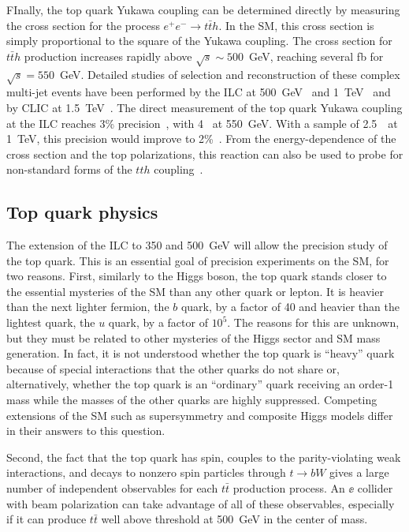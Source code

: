  FInally, the top quark Yukawa coupling can be determined directly by
 measuring the cross section for the process
$e^+e^- \rightarrow t\bar{t}h$.  In the SM, this cross section is simply
proportional to the square of the Yukawa coupling.   The cross 
section for $t\bar{t}h$ production increases rapidly above $\sqrt{s} \sim 500 $~GeV,
reaching several fb for $\sqrt{s} = 550$~GeV. Detailed studies of
selection
 and reconstruction of these complex multi-jet events
have been performed by the ILC at 500~GeV~\cite{Yonamine:2011jg} and
 1~TeV~\cite{Behnke:2013lya,Price:2014oca} and by CLIC
at 1.5~TeV~\cite{Abramowicz:2018rjq}. The direct measurement of the
top
 quark Yukawa coupling at the ILC reaches 3\%
precision~\cite{Fujii:2015jha}, with 4~\iab{} at 550~GeV.  With a sample of
2.5~\iab\  at 
1~TeV, this precision would improve to 2\%~\cite{Asner:2013psa}.  From
the energy-dependence of the cross section and the top polarizations,
this reaction can also be used to probe for non-standard forms of the
$tth$ coupling~\cite{Han:1999xd}.




\subsection{Top quark physics}
\label{subsec:highE:top}

The extension of the ILC to 350 and 500~GeV will allow the precision
study of the top quark.   This is an essential goal of precision
experiments on the SM, for two reasons.  First, similarly to the Higgs
boson, the top quark stands closer to the essential mysteries of the
SM than any other quark or lepton.   It is heavier than the next
lighter fermion, the $b$ quark, by a factor of 40 and heavier than the
lightest quark, the $u$ quark, by a factor of $10^5$.  The reasons for
this are unknown, but they must be related to other mysteries of the
Higgs sector and SM mass generation.  In fact, it is not understood
whether the top quark is ``heavy'' quark because of special
interactions that the other quarks do not share or, alternatively, whether the top
quark is an ``ordinary'' quark receiving an order-1 mass while the
masses of the other quarks are highly suppressed.  Competing extensions of the
SM such as supersymmetry and composite Higgs models differ in their
answers to this question.   

Second, the fact that the top quark has spin, couples to the
parity-violating weak interactions, and decays to nonzero spin
particles through  $t\to bW$ gives a large number of independent
observables for each $t\bar t$ production process. An $\ee$ collider
with beam polarization can take advantage of all of these observables,
especially if it can produce $t\bar t$ well above threshold at
500~GeV in the center of mass.  

